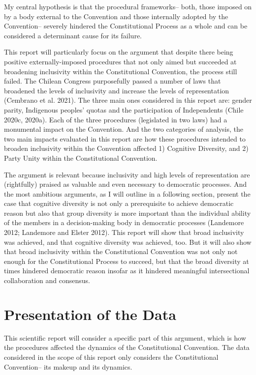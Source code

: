 \documentclass[
]{article}
\begin{document}
My central hypothesis is that the procedural frameworks-- both, those
imposed on by a body external to the Convention and those internally
adopted by the Convention-- severely hindered the Constitutional Process
as a whole and can be considered a determinant cause for its failure.

This report will particularly focus on the argument that despite there
being positive externally-imposed procedures that not only aimed but
succeeded at broadening inclusivity within the Constitutional
Convention, the process still failed. The Chilean Congress purposefully
passed a number of laws that broadened the levels of inclusivity and
increase the levels of representation (Cembrano et al. 2021). The three
main ones considered in this report are: gender parity, Indigenous
peoples' quotas and the participation of Independents (Chile 2020c,
2020a). Each of the three procedures (legislated in two laws) had a
monumental impact on the Convention. And the two categories of analysis,
the two main impacts evaluated in this report are how these procedures
intended to broaden inclusivity within the Convention affected 1)
Cognitive Diversity, and 2) Party Unity within the Constitutional
Convention.

The argument is relevant because inclusivity and high levels of
representation are (rightfully) praised as valuable and even necessary
to democratic processes. And the most ambitious arguments, as I will
outline in a following section, present the case that cognitive
diversity is not only a prerequisite to achieve democratic reason but
also that group diversity is more important than the individual ability
of the members in a decision-making body in democratic processes
(Landemore 2012; Landemore and Elster 2012). This report will show that
broad inclusivity was achieved, and that cognitive diversity was
achieved, too. But it will also show that broad inclusivity within the
Constitutional Convention was not only not enough for the Constitutional
Process to succeed, but that the broad diversity at times hindered
democratic reason insofar as it hindered meaningful intersectional
collaboration and consensus.

\hypertarget{presentation-of-the-data}{%
\section{Presentation of the Data}\label{presentation-of-the-data}}

This scientific report will consider a specific part of this argument,
which is how the procedures affected the dynamics of the Constitutional
Convention. The data considered in the scope of this report only
considers the Constitutional Convention-- its makeup and its dynamics.
\end{document}
